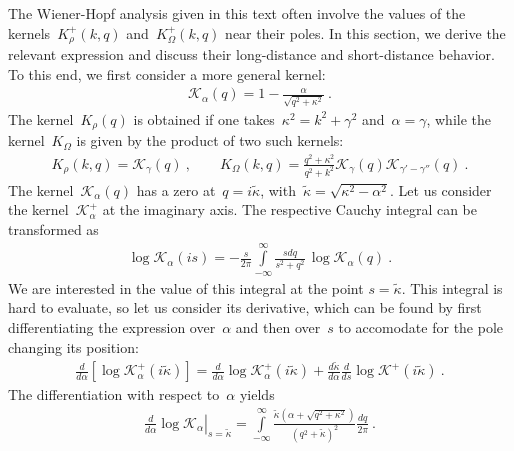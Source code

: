 \documentclass[preprint,aps,eqsecnum]{revtex4-1}
\newcommand{\fplus}[1]{{#1}^{+}}
\begin{document}
The Wiener-Hopf analysis given in this text often involve the
values of the kernels~$\fplus{K}_\rho(k, q)$ and~$\fplus{K}_\Omega(k, q)$ near
their poles. In this section, we derive the relevant expression
and discuss their long-distance and short-distance behavior.
To this end, we first consider a more general kernel:
\begin{align}
  \mathcal{K}_\alpha(q) = 1 - \frac{\alpha}{\sqrt{q^2 + \kappa^2}}\ .
\end{align}
The kernel~$K_\rho(q)$ is obtained if one takes~$\kappa^2 = k^2 + \gamma^2$
and~$\alpha = \gamma$, while the kernel~$K_\Omega$ is given by
the product of two such kernels:
\begin{align}
  \label{eq:appA-representation}
  K_\rho(k, q) = \mathcal{K}_\gamma(q)\ , \qquad
  K_\Omega(k, q) = \frac{q^2 + \kappa^2}{q^2 + k^2}
 \mathcal{K}_{\gamma}(q) \mathcal{K}_{\gamma' - \gamma''}(q)\ . 
\end{align}
The kernel~$\mathcal{K}_\alpha(q)$ has a zero at~$q = i {\tilde \kappa}$,
with~${\tilde \kappa} = \sqrt{\kappa^2 - \alpha^2}$.
Let us consider the kernel~$\fplus{\mathcal{K}}_\alpha$ at the imaginary axis.
The respective Cauchy integral can be transformed as
\begin{align}
  \log \mathcal{K}_{\alpha}(is) = - \frac{s}{2\pi}
  \int\limits_{-\infty}^{\infty}
  \frac{s dq}{s^2 + q^2} \, \log \mathcal{K}_{\alpha}(q)\ . 
\end{align}
We are interested in the value of this integral at the point
$s = {\tilde\kappa}$.
This integral is hard to evaluate, so let us consider its derivative,
which can be found by first differentiating the expression over~$\alpha$
and then over~$s$ to accomodate for the pole changing its position:
\begin{align}
  \label{eq:appA-two-contribs}
  \frac{d}{d\alpha} [\log \fplus{\mathcal{K}}_\alpha(i{\tilde \kappa})] =
  \frac{d}{d\alpha} \log \fplus{\mathcal{K}}_\alpha(i{\tilde \kappa})
  + \frac{d{\tilde \kappa}}{d\alpha}
  \frac{d}{ds} \log \fplus{\mathcal{K}} (i{\tilde \kappa}) \ . 
\end{align}
The differentiation with respect to~$\alpha$ yields
\begin{align}
  \left.\frac{d}{d\alpha}\log \mathcal{K}_{\alpha}
  \right|_{s = {\tilde\kappa}}
  = \int\limits_{-\infty}^{\infty}
  \frac{{\tilde\kappa} (\alpha + \sqrt{q^2 + \kappa^2})}{
  \left(q^2 + {\tilde \kappa}\right)^2} \frac{dq}{2\pi}
  \ . 
\end{align}
\end{document}
